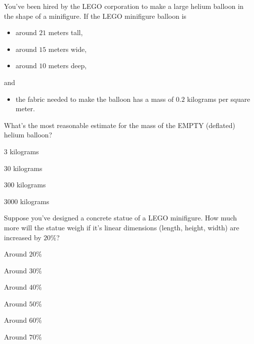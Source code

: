 \documentclass[noauthor,nooutcomes]{ximera}
\author{Bart Snapp}
\begin{document}
\maketitle


\begin{exercise}
  You've been hired by the LEGO corporation to make a large helium
  balloon in the shape of a minifigure. If the LEGO minifigure balloon
  is
\begin{itemize}
    \item around $21$ meters tall,
    \item around $15$ meters wide,
    \item around $10$ meters deep,
\end{itemize}
and
\begin{itemize}
\item the fabric needed to make the balloon has a mass of $0.2$ kilograms per square meter.
\end{itemize}
What's the most reasonable estimate for the mass of the EMPTY
(deflated) helium balloon?
\begin{enumerate}\begin{multicols}{2}
  \item $3$ kilograms
  \item $30$ kilograms
  \item $300$ kilograms
  \item $3000$ kilograms
  \end{multicols}
\end{enumerate}
\end{exercise}





\begin{exercise}
  Suppose you've designed a concrete statue of a LEGO minifigure.  How
  much more will the statue weigh if it's linear dimensions (length,
  height, width) are increased by $20\%$?
  \begin{enumerate}\begin{multicols}{2}
    \item Around $20\%$
    \item Around $30\%$
    \item Around $40\%$
    \item Around $50\%$
    \item Around $60\%$
    \item Around $70\%$
    \end{multicols}
  \end{enumerate}
\end{exercise}
\end{document}
